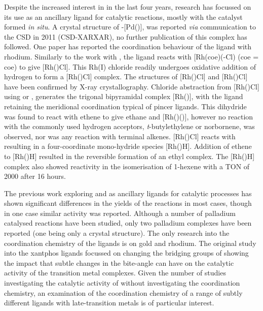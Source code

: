 Despite the increased interest in \tBuxantphos{} in the last four years, research has focussed on its use as an ancillary ligand for catalytic reactions, mostly with the catalyst formed \emph{in situ}.  A crystal structure of \trans-[Pd(\tBuxantphos)], was reported \emph{via} communication to the \gls{CSD} in 2011 (CSD-XARXAR), no further publication of this complex has followed.\cite{Allen2002}  One paper has reported the coordination behaviour of the \tBuxantphos{} ligand with rhodium.\cite{Haibach2013}  Similarly to the work with \iPrxantphos{}, the \tBuxantphos{} ligand reacts with [Rh(\acrshort{coe})(-Cl)\ce{]2} (\acrshort{coe} = \acrlong{coe}) to give [Rh(\tBuxantphosk)Cl].  This Rh(I) chloride readily undergoes oxidative addition of hydrogen to form a [Rh(\tBuxantphosk)Cl] complex.  The structures of [Rh(\tBuxantphosk)Cl] and [Rh(\tBuxantphosk)Cl] have been confirmed by X-ray crystallography.  Chloride abstraction from [Rh(\tBuxantphosk)Cl] using  or , generates the trigonal bipyramidal complex [Rh(\tBuxantphosk)], with the \tBuxantphos{} ligand retaining the meridional coordination typical of pincer ligands.  This dihydride was found to react with ethene to give ethane and [Rh(\tBuxantphosk)()], however no reaction with the commonly used hydrogen acceptors, \emph{t}-butylethylene or norbornene, was observed, nor was any reaction with terminal alkenes.  [Rh(\tBuxantphosk)Cl] reacts with  resulting in a four-coordinate mono-hydride species [Rh(\tBuxantphos)H].  Addition of ethene to [Rh(\tBuxantphos)H] resulted in the reversible formation of an ethyl complex.  The [Rh(\tBuxantphos)H] complex also showed reactivity in the isomerisation of 1-hexene with a \gls{TON} of 2000 after 16 hours.  

The previous work exploring \tBuxantphos{} and \Phxantphos{} as ancillary ligands for catalytic processes has shown significant differences in the yields of the reactions in most cases, though in one case similar activity was reported.  Although a number of palladium catalysed reactions have been studied, only two palladium complexes have been reported (one being only a crystal structure).  The only research into the coordination chemistry of the \tBuxantphos{} ligands is on gold and rhodium.\cite{Partyka2010, Haibach2013}  The original study into the xantphos ligands focussed on changing the bridging groups of \Phxantphos{} showing the impact that subtle changes in the bite-angle can have on the catalytic activity of the transition metal complexes.\cite{Kranenburg1995}  Given the number of studies investigating the catalytic activity of \tBuxantphos{} without investigating the coordination chemistry, an examination of the coordination chemistry of a range of subtly different \tBuxantphos{} ligands with late-transition metals is of particular interest.   

